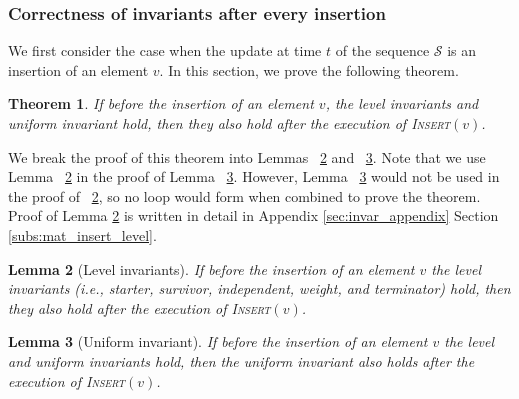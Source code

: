 \documentclass[11pt]{article}
\newtheorem{theorem}{Theorem}
\newtheorem{lemma}[theorem]{Lemma}
\newcommand{\insertv}{{\textsc{Insert}}}
\begin{document}
\subsubsection{Correctness of invariants after every insertion}

We first consider the case when the update at time $t$ of the sequence $\mathcal{S}$ is an insertion of an element $v$. 
In this section, we prove the following theorem. 


\begin{theorem}
\label{mat_insert:invariants}
If before the insertion of an element $v$, the level invariants and uniform invariant hold, then they also hold after the execution of \insertv$(v)$. 
\end{theorem}

We break the proof of this theorem into Lemmas ~\ref{mat_insert_level} and ~\ref{mat_insert_uni}. 
Note that we use Lemma ~\ref{mat_insert_level} in the proof of Lemma ~\ref{mat_insert_uni}. However, Lemma ~\ref{mat_insert_uni} would not be used in the proof of ~\ref{mat_insert_level}, so no loop would form when combined to prove the theorem. Proof of Lemma \ref{mat_insert_level} is written in detail in Appendix \ref{sec:invar_appendix} Section \ref{subs:mat_insert_level}. 


\begin{lemma} [Level invariants]
\label{mat_insert_level}
If before the insertion of an element $v$ the level invariants (i.e., starter, survivor, independent, weight, and terminator) hold, 
then they also hold after the execution of \insertv$(v)$. 
\end{lemma}


\begin{lemma} [Uniform invariant]
\label{mat_insert_uni}
If before the insertion of an element $v$ the level and uniform invariants hold, then the uniform invariant also holds after the execution of \insertv$(v)$. 
\end{lemma}
\end{document}
